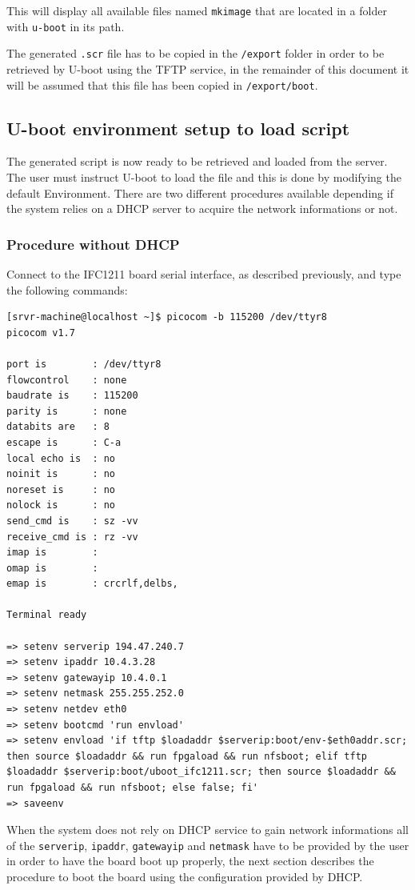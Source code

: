 \documentclass[11pt
  , a4paper
  , article
  , oneside
  , showtrims
]{memoir}
\begin{document}
This will display all available files named \texttt{mkimage} that are located in a folder with \texttt{u-boot} in its path.

The generated \texttt{.scr} file has to be copied in the \texttt{/export} folder in order to be retrieved by U-boot using the TFTP service, in the remainder of this document it will be assumed that this file has been copied in \texttt{/export/boot}.



\subsection{U-boot environment setup to load script}
The generated script is now ready to be retrieved and loaded from the server.
The user must instruct U-boot to load the file and this is done by modifying the default Environment.
There are two different procedures available depending if the system relies on a DHCP server to acquire the network informations or not.

\subsubsection{Procedure without DHCP}
Connect to the IFC1211 board serial interface, as described previously, and type the following commands:

\begin{lstlisting}[style=termstyle]
[srvr-machine@localhost ~]$ picocom -b 115200 /dev/ttyr8
picocom v1.7

port is        : /dev/ttyr8
flowcontrol    : none
baudrate is    : 115200
parity is      : none
databits are   : 8
escape is      : C-a
local echo is  : no
noinit is      : no
noreset is     : no
nolock is      : no
send_cmd is    : sz -vv
receive_cmd is : rz -vv
imap is        : 
omap is        : 
emap is        : crcrlf,delbs,

Terminal ready

=> setenv serverip 194.47.240.7
=> setenv ipaddr 10.4.3.28
=> setenv gatewayip 10.4.0.1
=> setenv netmask 255.255.252.0
=> setenv netdev eth0
=> setenv bootcmd 'run envload'
=> setenv envload 'if tftp $loadaddr $serverip:boot/env-$eth0addr.scr; then source $loadaddr && run fpgaload && run nfsboot; elif tftp $loadaddr $serverip:boot/uboot_ifc1211.scr; then source $loadaddr && run fpgaload && run nfsboot; else false; fi'
=> saveenv
\end{lstlisting}

When the system does not rely on DHCP service to gain network informations all of the \texttt{serverip}, \texttt{ipaddr}, \texttt{gatewayip} and \texttt{netmask} have to be provided by the user in order to have the board boot up properly, the next section describes the procedure to boot the board using the configuration provided by DHCP.
\end{document}
